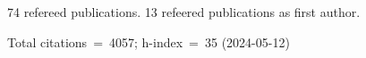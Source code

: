 74 refereed publications. 13 refeered publications as first author.

Total citations~=~4057; h-index~=~35 (2024-05-12)
